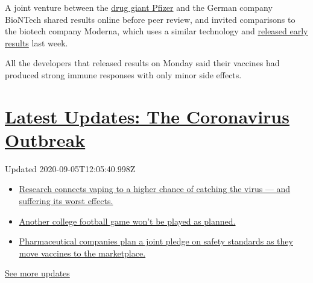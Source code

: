 A joint venture between the
\href{https://www.nytimes3xbfgragh.onion/2020/07/22/us/politics/pfizer-coronavirus-vaccine.html}{drug
giant Pfizer} and the German company BioNTech shared results online
before peer review, and invited comparisons to the biotech company
Moderna, which uses a similar technology and
\href{https://www.nytimes3xbfgragh.onion/2020/07/14/health/cornavirus-vaccine-moderna.html}{released
early results} last week.

All the developers that released results on Monday said their vaccines
had produced strong immune responses with only minor side effects.

\hypertarget{latest-updates-the-coronavirus-outbreak}{%
\section{\texorpdfstring{\href{https://www.nytimes3xbfgragh.onion/2020/09/04/world/covid-19-coronavirus.html?action=click\&pgtype=Article\&state=default\&region=MAIN_CONTENT_1\&context=storylines_live_updates}{Latest
Updates: The Coronavirus
Outbreak}}{Latest Updates: The Coronavirus Outbreak}}\label{latest-updates-the-coronavirus-outbreak}}

Updated 2020-09-05T12:05:40.998Z

\begin{itemize}
\tightlist
\item
  \href{https://www.nytimes3xbfgragh.onion/2020/09/04/world/covid-19-coronavirus.html?action=click\&pgtype=Article\&state=default\&region=MAIN_CONTENT_1\&context=storylines_live_updates\#link-1654f6ad}{Research
  connects vaping to a higher chance of catching the virus --- and
  suffering its worst effects.}
\item
  \href{https://www.nytimes3xbfgragh.onion/2020/09/04/world/covid-19-coronavirus.html?action=click\&pgtype=Article\&state=default\&region=MAIN_CONTENT_1\&context=storylines_live_updates\#link-52e4198a}{Another
  college football game won't be played as planned.}
\item
  \href{https://www.nytimes3xbfgragh.onion/2020/09/04/world/covid-19-coronavirus.html?action=click\&pgtype=Article\&state=default\&region=MAIN_CONTENT_1\&context=storylines_live_updates\#link-181cef0}{Pharmaceutical
  companies plan a joint pledge on safety standards as they move
  vaccines to the marketplace.}
\end{itemize}

\href{https://www.nytimes3xbfgragh.onion/2020/09/04/world/covid-19-coronavirus.html?action=click\&pgtype=Article\&state=default\&region=MAIN_CONTENT_1\&context=storylines_live_updates}{See
more updates}

